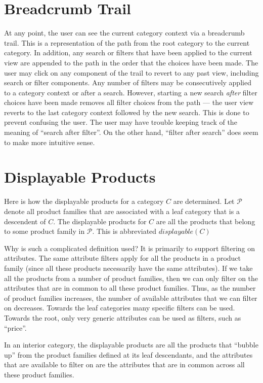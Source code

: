 \documentclass[letterpaper, 12pt]{article}
\begin{document}
\section{Breadcrumb Trail}
At any point, the user can see the current category context via a breadcrumb trail.  This is a representation of the path from the root category to the current category.  In addition, any search or filters that have been applied to the current view are appended to the path in the order that the choices have been made.  The user may click on any component of the trail to revert to any past view, including search or filter components. Any number of filters may be consecutively applied to a category context or after a search. However, starting a new search {\em after} filter choices have been made removes all filter choices from the path --- the user view reverts to the last category context followed by the new search.  This is done to prevent confusing the user.  The user may have trouble keeping track of the meaning of ``search after filter''.  On the other hand, ``filter after search'' does seem to make more intuitive sense.

\section{Displayable Products}
Here is how the displayable products for a category $C$ are determined.  Let $\mathscr{P}$ denote all product families that are associated with a leaf category that is a descendent of $C$.  The displayable products for $C$ are all the products that belong to some product family in $\mathscr{P}$.  This is abbreviated $displayable(C)$
\par
Why is such a complicated definition used?  It is primarily to support filtering on attributes.  The same attribute filters apply for all the products in a product family (since all these products necessarily have the same attributes).  If we take all the products from a number of product families, then we can only filter on the attributes that are in common to all these product families.  Thus, as the number of product families increases, the number of available attributes that we can filter on decreases.  Towards the leaf categories many specific filters can be used.  Towards the root, only very generic attributes can be used as filters, such as ``price''.
\par
In an interior category, the displayable products are all the products that ``bubble up'' from the product families defined at its leaf descendants, and the attributes that are available to filter on are  the attributes that are in common across all these product families.
\end{document}
